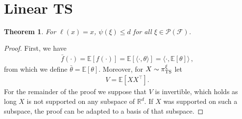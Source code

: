 \documentclass[letter, 12pt]{report}
\newcommand{\R}{\mathbb R}
\newcommand{\E}{\mathbb E}
\newcommand{\sF}{\mathscr F}
\newcommand{\sP}{\mathscr P}
\newcommand{\1}{\mathbf{1}}
\newcommand{\ts}{\textsc{TS}\xspace}
\theoremstyle{plain}
\newtheorem{theorem}{Theorem}
\theoremstyle{definition}
\theoremstyle{remark}
\begin{document}
\section{Linear \ts}
\begin{theorem}
    For $\ell(x) = x$, $\psi(\xi) \leq d$ for all $\xi \in \sP(\sF)$.
    \label{thm:ir-ts-linear}
\end{theorem}
\begin{proof}
    First, we have
    \begin{align*}
        \bar f(\cdot) = \E[f(\cdot)] = \E[\langle \cdot, \theta \rangle] = \langle \cdot, \E[\theta]\rangle\,,
    \end{align*}
    from which we define $\bar{\theta} = \E[\theta]$.
    Moreover, for $X \sim \pi_\ts^\xi$ let
    \begin{align*}
        V = \E[X X^\top].
    \end{align*}
    For the remainder of the proof we suppose that $V$ is invertible,
    which holds as long $X$ is not supported on any subspace of $\R^d$.
    If $X$ was supported on such a subspace, the proof can be adapted
    to a basis of that subspace.


\end{proof}
\end{document}

